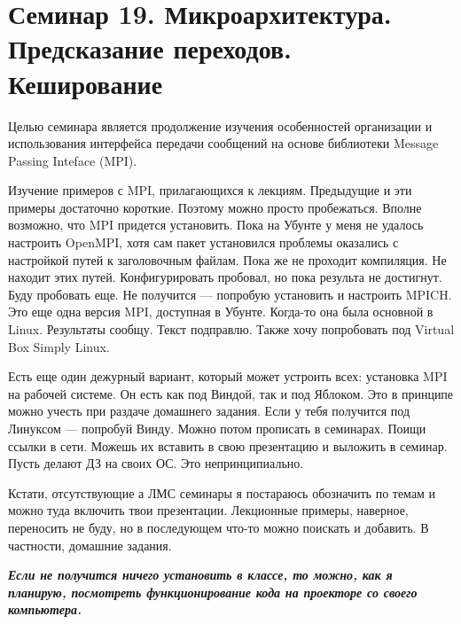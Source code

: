 \chapter[19]{Семинар 19. Микроархитектура. Предсказание переходов. Кеширование}

Целью семинара является продолжение изучения особенностей организации и использования интерфейса передачи сообщений на основе библиотеки Message Passing Inteface (MPI).

Изучение примеров с MPI, прилагающихся к лекциям. Предыдущие и эти примеры достаточно короткие. Поэтому можно просто пробежаться. Вполне возможно, что MPI придется установить. Пока на Убунте у меня не удалось настроить OpenMPI, хотя сам пакет установился проблемы оказались с настройкой путей к заголовочным файлам. Пока же не проходит компиляция. Не находит этих путей. Конфигурировать пробовал, но пока результа не достигнут. Буду пробовать еще. Не получится --- попробую установить и настроить MPICH. Это еще одна версия MPI, доступная в Убунте. Когда-то она была основной в Linux. Результаты сообщу. Текст подправлю. Также хочу попробовать под Virtual Box Simply Linux.

Есть еще один дежурный вариант, который может устроить всех: установка MPI на рабочей системе. Он есть как под Виндой, так и под Яблоком. Это в принципе можно учесть при раздаче домашнего задания. Если у тебя получится под Линуксом --- попробуй Винду. Можно потом прописать в семинарах. Поищи ссылки в сети. Можешь их вставить в свою презентацию и выложить в семинар. Пусть делают ДЗ на своих ОС. Это непринципиально.

Кстати, отсутствующие а ЛМС семинары я постараюсь обозначить по темам и можно туда включить твои презентации. Лекционные примеры, наверное, переносить не буду, но в последующем что-то можно поискать и добавить. В частности, домашние задания.

\textbf{\textit{Если не получится ничего установить в классе, то можно, как я планирую, посмотреть функционирование кода на проекторе со своего компьютера.}}


